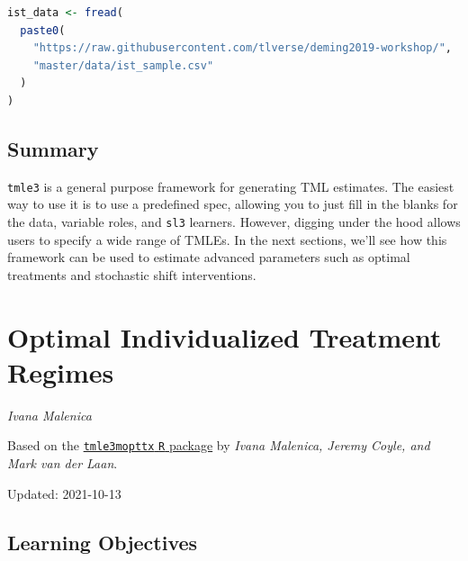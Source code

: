\documentclass[
  12pt, krantz2,
]{krantz}
\newcommand{\passthrough}[1]{#1}
\theoremstyle{definition}
\theoremstyle{definition}
\theoremstyle{definition}
\newcommand{\1}{\mathbbm{1}}
\begin{document}
\begin{lstlisting}[language=R]
ist_data <- fread(
  paste0(
    "https://raw.githubusercontent.com/tlverse/deming2019-workshop/",
    "master/data/ist_sample.csv"
  )
)
\end{lstlisting}

\hypertarget{summary}{%
\section{Summary}\label{summary}}

\passthrough{\lstinline!tmle3!} is a general purpose framework for generating TML estimates. The easiest
way to use it is to use a predefined spec, allowing you to just fill in the
blanks for the data, variable roles, and \passthrough{\lstinline!sl3!} learners. However, digging under
the hood allows users to specify a wide range of TMLEs. In the next sections,
we'll see how this framework can be used to estimate advanced parameters such as
optimal treatments and stochastic shift interventions.

\hypertarget{optimal-individualized-treatment-regimes}{%
\chapter{Optimal Individualized Treatment Regimes}\label{optimal-individualized-treatment-regimes}}

\emph{Ivana Malenica}

Based on the \href{https://github.com/tlverse/tmle3mopttx}{\passthrough{\lstinline!tmle3mopttx!} \passthrough{\lstinline!R!} package}
by \emph{Ivana Malenica, Jeremy Coyle, and Mark van der Laan}.

Updated: 2021-10-13

\hypertarget{learning-objectives-1}{%
\section{Learning Objectives}\label{learning-objectives-1}}
\end{document}
